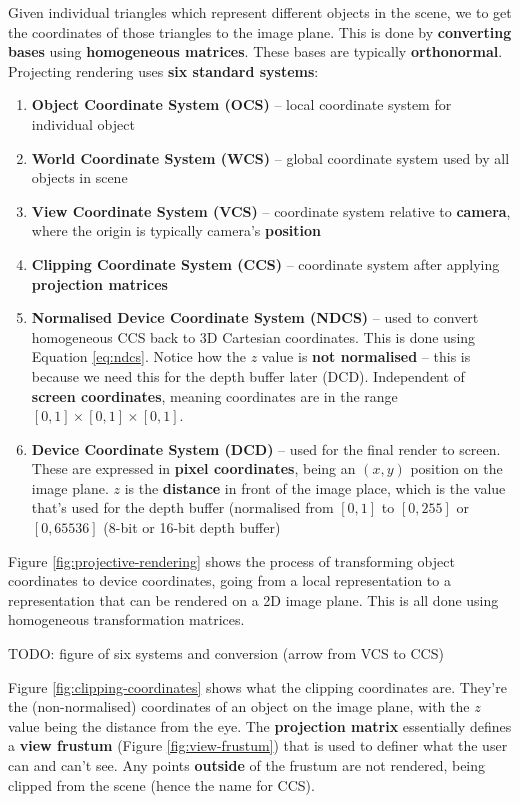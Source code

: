 \documentclass{article}
\begin{document}
Given individual triangles which represent different objects in the scene, we to get the coordinates of those triangles to the image plane. This is done by \textbf{converting bases} using \textbf{homogeneous matrices}. These bases are typically \textbf{orthonormal}. Projecting rendering uses \textbf{six standard systems}:
\begin{enumerate}
	\item \textbf{Object Coordinate System (OCS)} -- local coordinate system for individual object
	\item \textbf{World Coordinate System (WCS)} -- global coordinate system used by all objects in scene
	\item \textbf{View Coordinate System (VCS)} -- coordinate system relative to \textbf{camera}, where the origin is typically camera's \textbf{position}
	\item \textbf{Clipping Coordinate System (CCS)} -- coordinate system after applying \textbf{projection matrices}
	\item \textbf{Normalised Device Coordinate System (NDCS)} -- used to convert homogeneous CCS back to 3D Cartesian coordinates. This is done using Equation \ref{eq:ndcs}. Notice how the $z$ value is \textbf{not normalised} -- this is because we need this for the depth buffer later (DCD). Independent of \textbf{screen coordinates}, meaning coordinates are in the range $[0,1] \times [0,1] \times [0,1]$.
	\item \textbf{Device Coordinate System (DCD)} -- used for the final render to screen. These are expressed in \textbf{pixel coordinates}, being an $(x, y)$ position on the image plane. $z$ is the \textbf{distance} in front of the image place, which is the value that's used for the depth buffer (normalised from $[0,1]$ to $[0,255]$ or $[0,65536]$ (8-bit or 16-bit depth buffer)
\end{enumerate}
Figure \ref{fig:projective-rendering} shows the process of transforming object coordinates to device coordinates, going from a local representation to a representation that can be rendered on a 2D image plane. This is all done using homogeneous transformation matrices.

TODO: figure of six systems and conversion (arrow from VCS to CCS)

Figure \ref{fig:clipping-coordinates} shows what the clipping coordinates are. They're the (non-normalised) coordinates of an object on the image plane, with the $z$ value being the distance from the eye. The \textbf{projection matrix} essentially defines a \textbf{view frustum} (Figure \ref{fig:view-frustum}) that is used to definer what the user can and can't see. Any points \textbf{outside} of the frustum are not rendered, being clipped from the scene (hence the name for CCS).
\end{document}
